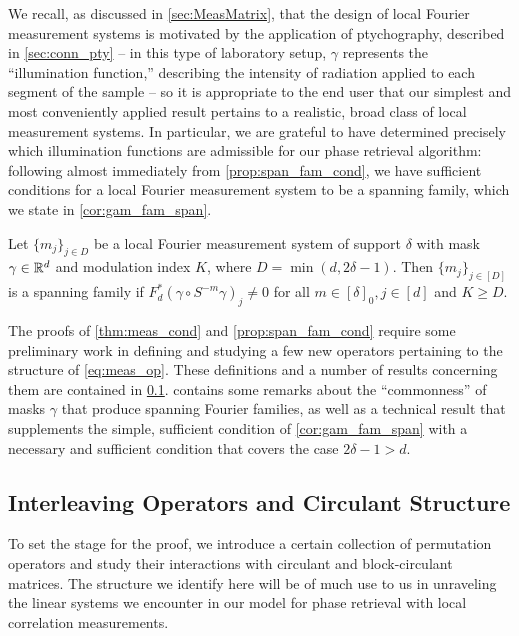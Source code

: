 We recall, as discussed in \cref{sec:MeasMatrix}, that the design of local Fourier measurement systems is motivated by the application of ptychography, described in \cref{sec:conn_pty} -- in this type of laboratory setup, $\gamma$ represents the ``illumination function,'' describing the intensity of radiation applied to each segment of the sample -- so it is appropriate to the end user that our simplest and most conveniently applied result pertains to a realistic, broad class of local measurement systems.  In particular, we are grateful to have determined precisely which illumination functions are admissible for our phase retrieval algorithm: following almost immediately from \cref{prop:span_fam_cond}, we have sufficient conditions for a local Fourier measurement system to be a spanning family, which we state in \cref{cor:gam_fam_span}.
\begin{corollary}
  Let $\{m_j\}_{j \in D}$ be a local Fourier measurement system of support $\delta$ with mask $\gamma \in \mathbb{R}^d$ and modulation index $K$, where $D = \min(d, 2 \delta - 1)$.  Then $\{m_j\}_{j \in [D]}$ is a spanning family if $F_d^*(\gamma \circ S^{-m} \gamma)_j \neq 0$ for all $m \in [\delta]_0, j \in [d]$ and $K \ge D$.
  \label{cor:gam_fam_span}
\end{corollary}

The proofs of \cref{thm:meas_cond} and \cref{prop:span_fam_cond} require some preliminary work in defining and studying a few new operators pertaining to the structure of \eqref{eq:meas_op}.  These definitions and a number of results concerning them are contained in \cref{sec:interlemma}.   contains some remarks about the ``commonness'' of masks $\gamma$ that produce spanning Fourier families, as well as a technical result that supplements the simple, sufficient condition of \cref{cor:gam_fam_span} with a necessary and sufficient condition that covers the case $2 \delta - 1 > d$.

\subsection{Interleaving Operators and Circulant Structure}
\label{sec:interlemma}

To set the stage for the proof, we introduce a certain collection of permutation operators and study their interactions with circulant and block-circulant matrices.  The structure we identify here will be of much use to us in unraveling the linear systems we encounter in our model for phase retrieval with local correlation measurements.


